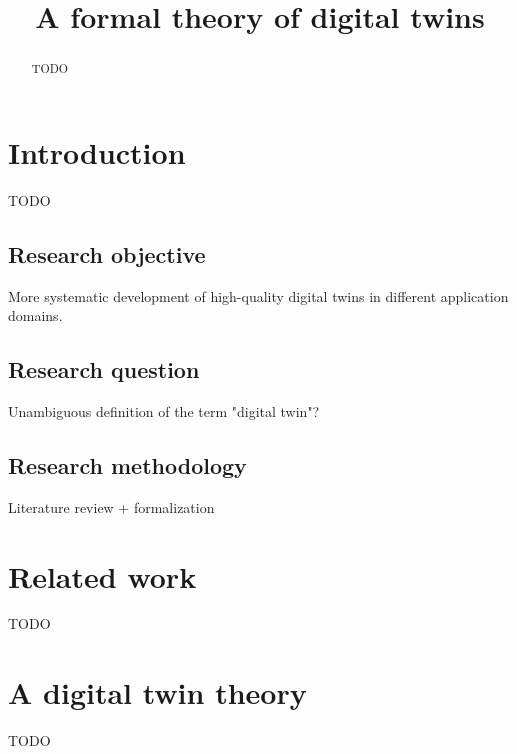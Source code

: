 \documentclass[conference]{IEEEtran}
\begin{document}
    \title{A formal theory of digital twins}

    \author{
        \and 
    }
   
    \maketitle 

    \begin{abstract}
        TODO
    \end{abstract}

    \section{Introduction}
    \label{section:introduction}
    TODO~\cite{asf}

    \subsection{Research objective}
    More systematic development of high-quality digital twins in different application domains.

    \subsection{Research question}
    Unambiguous definition of the term "digital twin"?

    \subsection{Research methodology}
    Literature review + formalization

    \section{Related work}
    TODO

    \section{A digital twin theory}
    \label{section:theory}
    TODO
\end{document}

